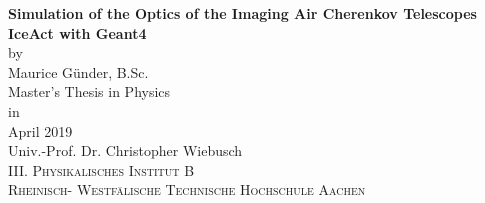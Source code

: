 \begin{titlepage}
\addtolength{\oddsidemargin}{4mm}
\begin{center}

\LARGE
\textbf{Simulation of the Optics of the Imaging Air Cherenkov Telescopes IceAct with Geant4} \\[15mm]

{\large by}\\[1mm]
\Large
Maurice Günder, B.Sc.\\[18mm]

Master's Thesis in Physics\\[70mm]

{\large in}\\[1mm]
April 2019\\[35mm]

Univ.-Prof. Dr. Christopher Wiebusch \\\textsc{III. Physikalisches Institut B \\Rheinisch- Westfälische Technische Hochschule Aachen}

\end{center}
\end{titlepage}